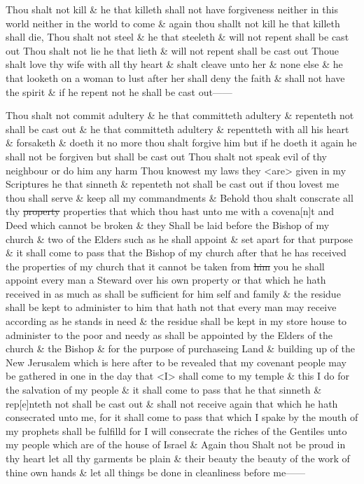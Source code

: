 				Thou shalt not kill \& he that killeth shall not have forgiveness neither in this world neither in the world to come \& again thou shallt not kill he that killeth shall die, Thou shalt not steel \& he that steeleth \& will not repent shall be cast out Thou shalt not lie he that lieth \& will not repent shall be cast out Thoue shalt love thy wife with all thy heart \& shalt cleave unto her \& none else \& he that looketh on a woman to lust after her shall deny the faith \& shall not have the spirit \& if he repent not he shall be cast out------
				
				Thou shalt not commit adultery \& he that committeth adultery \& repenteth not shall be cast out \& he that committeth adultery \& repentteth with all his heart \& forsaketh \& doeth it no more thou shalt forgive him but if he doeth it again he shall not be forgiven but shall be cast out Thou shalt not speak evil of thy neighbour or do him any harm Thou knowest my laws they <are> given in my Scriptures he that sinneth \& repenteth not shall be cast out if thou lovest me thou shall serve \& keep all my commandments \& Behold thou shalt conscrate all thy \sout{property} properties that which thou hast unto me with a covena[n]t and Deed which cannot be broken \& they Shall be laid before the Bishop of my church \& two of the Elders such as he shall appoint \& set apart for that purpose \& it shall come to pass that the Bishop of my church after that he has received the properties of my church that it cannot be taken from \sout{him} you he shall appoint every man a Steward over his own property or that which he hath received in as much as shall be sufficient for him self and family \& the residue shall be kept to administer to him that hath not that every man may receive according as he stands in need \& the residue shall be kept in my store house to administer to the poor and needy as shall be appointed by the Elders of the church \& the Bishop \& for the purpose of purchaseing Land \& building up of the New Jerusalem which is here after to be revealed that my covenant people may be gathered in one in the day that <I> shall come to my temple \& this I do for the salvation of my people \& it shall come to pass that he that sinneth \& rep[e]nteth not shall be cast out \& shall not receive again that which he hath consecrated unto me, for it shall come to pass that which I spake by the mouth of my prophets shall be fulfilld for I will consecrate the riches of the Gentiles unto my people which are of the house of Israel \& Again thou Shalt not be proud in thy heart let all thy garments be plain \& their beauty the beauty of the work of thine own hands \& let all things be done in cleanliness before me------
				
